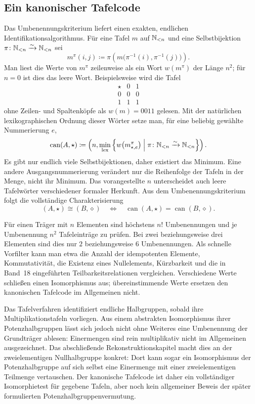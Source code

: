 \documentclass[main.tex]{subfiles}
\begin{document}
\subsection{Ein kanonischer Tafelcode}

Das Umbenennungskriterium liefert einen exakten, endlichen
Identifikationsalgorithmus.  Für eine Tafel \(m\) auf \(\mathbb{N}_{<n}\)
und eine Selbstbijektion
\(\pi\colon\mathbb{N}_{<n}\xrightarrow{\sim}\mathbb{N}_{<n}\) sei
\[
  m^{\pi}(i,j)
  \coloneqq
  \pi\!\left(m\bigl(\pi^{-1}(i),\pi^{-1}(j)\bigr)\right).
\]
Man liest die Werte von \(m^{\pi}\) zeilenweise als ein Wort
\(w(m^{\pi})\) der Länge \(n^2\); für \(n=0\) ist dies das leere
Wort.  Beispielsweise wird die Tafel
\[
\begin{array}{c|cc}
\star&0&1\\\hline
0&0&0\\
1&1&1
\end{array}
\]
ohne Zeilen- und Spaltenköpfe als \(w(m)=0011\) gelesen.  Mit der natürlichen
lexikographischen Ordnung dieser Wörter setze man, für eine beliebig gewählte
Nummerierung \(e\),
\[
  \operatorname{can}(A,\star)
  \coloneqq
  \left(
    n,
    \min_{\mathrm{lex}}
    \left\{
      w\!\left(m_{\star,e}^{\pi}\right)
      \;\middle|\;
      \pi\colon\mathbb{N}_{<n}\xrightarrow{\sim}\mathbb{N}_{<n}
    \right\}
  \right).
\]
Es gibt nur endlich viele Selbstbijektionen, daher existiert das Minimum.
Eine andere Ausgangsnummerierung verändert nur die Reihenfolge der Tafeln
in der Menge, nicht ihr Minimum.  Das vorangestellte \(n\) unterscheidet
auch leere Tafelwörter verschiedener formaler Herkunft.  Aus dem
Umbenennungskriterium folgt die vollständige Charakterisierung
\[
  (A,\star)\cong(B,\diamond)
  \quad\Longleftrightarrow\quad
  \operatorname{can}(A,\star)
    =\operatorname{can}(B,\diamond).
\]

Für einen Träger mit \(n\) Elementen sind höchstens \(n!\)
Umbenennungen und je Umbenennung \(n^2\) Tafeleinträge zu prüfen.  Bei
zwei beziehungsweise drei Elementen sind dies nur \(2\) beziehungsweise
\(6\) Umbenennungen.  Als schnelle Vorfilter kann man etwa die Anzahl der
idempotenten Elemente, Kommutativität, die Existenz eines Nullelements,
Kürzbarkeit und die in Band~18 eingeführten Teilbarkeitsrelationen
vergleichen.  Verschiedene Werte schließen einen Isomorphismus aus;
übereinstimmende Werte ersetzen den kanonischen Tafelcode im Allgemeinen
nicht.

\begin{remark}
Das Tafelverfahren identifiziert endliche Halbgruppen, sobald ihre
Multiplikationstafeln vorliegen.  Aus einem abstrakten Isomorphismus ihrer
Potenzhalbgruppen lässt sich jedoch nicht ohne Weiteres eine Umbenennung der
Grundträger ablesen: Einermengen sind rein multiplikativ nicht im
Allgemeinen ausgezeichnet.  Das abschließende Rekonstruktionskapitel macht
dies an der zweielementigen Nullhalbgruppe konkret: Dort kann sogar ein
Isomorphismus der Potenzhalbgruppe auf sich selbst eine Einermenge mit einer
zweielementigen Teilmenge vertauschen.  Der kanonische Tafelcode ist daher
ein vollständiger Isomorphietest für gegebene Tafeln, aber noch kein
allgemeiner Beweis der später formulierten Potenzhalbgruppenvermutung.
\end{remark}
\end{document}
